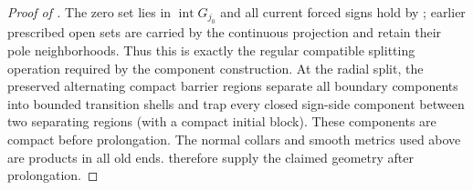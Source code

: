 \begin{proof}[Proof of ]
The zero set lies in $\operatorname{int}G_{j_0}$ and all current
forced signs hold by ; earlier prescribed open sets
are carried by the continuous projection and retain their pole
neighborhoods.  Thus this is exactly the regular compatible splitting
operation required by the component construction.  At the radial split,
the preserved alternating compact barrier regions separate all boundary
components into bounded transition shells and trap every closed
sign-side component between two separating regions (with a compact
initial block).  These components are compact before prolongation.
The normal collars and smooth metrics used above are products in all
old ends.   therefore supply the
claimed geometry after prolongation.
\end{proof}
